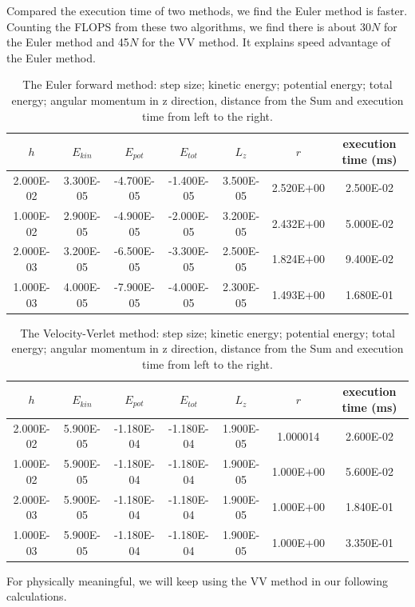  Compared the execution time of two methods, we find the Euler method is faster. 
 Counting the FLOPS from these two algorithms, we find there is  about 30$N$ for the Euler method and 45$N$ for the VV method. It explains speed advantage of the Euler method.
 
\begin{table}[tb]
	\centering
	\caption{The Euler forward method: step size; kinetic energy; potential energy; total energy; angular momentum in z direction, distance from the Sum and execution time from left to the right.}
	\label{tab::euler}
	\begin{tabular}{ccccccc}
	\hline
	\hline
$h$          & $E_{kin}$        & $E_{pot}$         & $E_{tot}$          & $L_z$        & $r$         & execution time (ms)         \\
	\hline
2.000E-02 & 3.300E-05 & -4.700E-05 & -1.400E-05 & 3.500E-05 & 2.520E+00 & 2.500E-02 \\
1.000E-02 & 2.900E-05 & -4.900E-05 & -2.000E-05 & 3.200E-05 & 2.432E+00 & 5.000E-02 \\
2.000E-03 & 3.200E-05 & -6.500E-05 & -3.300E-05 & 2.500E-05 & 1.824E+00 & 9.400E-02 \\
1.000E-03 & 4.000E-05 & -7.900E-05 & -4.000E-05 & 2.300E-05 & 1.493E+00 & 1.680E-01\\
	\hline
	\hline
\end{tabular}
\end{table}

\begin{table}[tb]
	\centering
	\caption{The Velocity-Verlet method: step size; kinetic energy; potential energy; total energy; angular momentum in z direction, distance from the Sum and execution time from left to the right.}
	\label{tab::verlet}
	\begin{tabular}{ccccccc}
	\hline
	\hline
$h$          & $E_{kin}$        & $E_{pot}$         & $E_{tot}$          & $L_z$        & $r$         & execution time (ms)         \\
	\hline
2.000E-02 & 5.900E-05 & -1.180E-04 & -1.180E-04 & 1.900E-05 & 1.000014 & 2.600E-02 \\
1.000E-02 & 5.900E-05 & -1.180E-04 & -1.180E-04 & 1.900E-05 & 1.000E+00 & 5.600E-02 \\
2.000E-03 & 5.900E-05 & -1.180E-04 & -1.180E-04 & 1.900E-05 & 1.000E+00 & 1.840E-01 \\
1.000E-03 & 5.900E-05 & -1.180E-04 & -1.180E-04 & 1.900E-05 & 1.000E+00 & 3.350E-01\\
	\hline
	\hline
\end{tabular}
\end{table}

For physically meaningful, we will keep using the VV method in our following calculations.